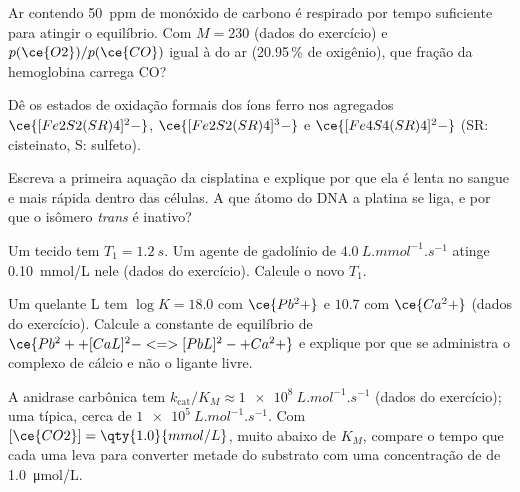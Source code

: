 \begin{exercise}[$\star\star$]\label{exo:b3:bioinorganic:6}
Ar contendo \qty{50}{ppm} de monóxido de carbono é respirado por tempo suficiente para atingir
o equilíbrio. Com $M = 230$ (dados do exercício) e $p(\ce{O2})/p(\ce{CO})$ igual à do ar
(20.95\,\% de oxigênio), que fração da hemoglobina carrega CO?
\end{exercise}

\begin{exercise}[$\star\star$]\label{exo:b3:bioinorganic:7}
Dê os estados de oxidação formais dos íons ferro nos agregados $\ce{[Fe2S2(SR)4]^2-}$,
$\ce{[Fe2S2(SR)4]^3-}$ e $\ce{[Fe4S4(SR)4]^2-}$ (SR: cisteinato, S: sulfeto).
\end{exercise}

\begin{exercise}[$\star\star$]\label{exo:b3:bioinorganic:8}
Escreva a primeira aquação da cisplatina e explique por que ela é lenta no sangue e
mais rápida dentro das células. A que átomo do DNA a platina se liga, e por que o
isômero \textit{trans} é inativo?
\end{exercise}

\begin{exercise}[$\star\star$]\label{exo:b3:bioinorganic:9}
Um tecido tem $T_1 = \qty{1.2}{s}$. Um agente de gadolínio de  $\qty{4.0}{L.mmol^{-1}.s^{-1}}$ atinge \qty{0.10}{mmol/L}
nele (dados do exercício). Calcule o novo $T_1$.
\end{exercise}

\begin{exercise}[$\star\star\star$]\label{exo:b3:bioinorganic:10}
Um quelante L tem $\log K = 18.0$ com $\ce{Pb^2+}$ e $10.7$ com $\ce{Ca^2+}$ (dados do exercício).
Calcule a constante de equilíbrio de $\ce{Pb^2+ + [CaL]^2- <=> [PbL]^2- + Ca^2+}$ e explique por que se administra o complexo
de cálcio e não o ligante livre.
\end{exercise}

\begin{exercise}[$\star\star\star$]\label{exo:b3:bioinorganic:11}
A anidrase carbônica tem $k_{\mathrm{cat}}/K_M \approx \qty{1e8}{L.mol^{-1}.s^{-1}}$ (dados do exercício); uma  típica, cerca de
$\qty{1e5}{L.mol^{-1}.s^{-1}}$. Com $[\ce{CO2}] = \qty{1.0}{mmol/L}$, muito abaixo de $K_M$, compare o tempo que cada uma leva para converter metade
do substrato com uma concentração de  de \qty{1.0}{\micro mol/L}.
\end{exercise}

